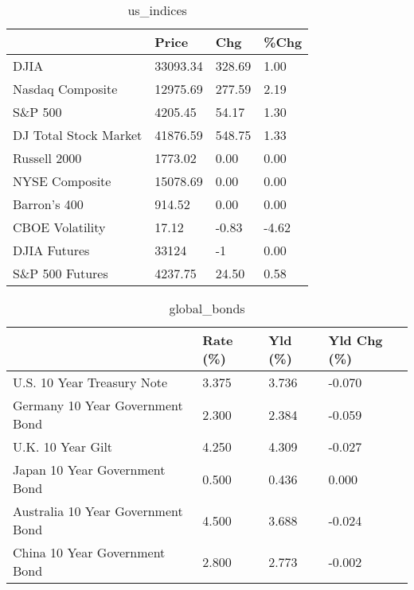 \documentclass{article}%
\begin{document}
%


\begin{table}[htbp]%
\caption{us\_indices}%
\centering%
\begin{adjustbox}{width=1\textwidth}%
\begin{tabular}{llll}
\toprule
                      &    Price &    Chg &  \%Chg \\
\midrule
                 DJIA & 33093.34 & 328.69 &  1.00 \\
     Nasdaq Composite & 12975.69 & 277.59 &  2.19 \\
              S\&P 500 &  4205.45 &  54.17 &  1.30 \\
DJ Total Stock Market & 41876.59 & 548.75 &  1.33 \\
         Russell 2000 &  1773.02 &   0.00 &  0.00 \\
       NYSE Composite & 15078.69 &   0.00 &  0.00 \\
         Barron's 400 &   914.52 &   0.00 &  0.00 \\
      CBOE Volatility &    17.12 &  -0.83 & -4.62 \\
         DJIA Futures &    33124 &     -1 &  0.00 \\
      S\&P 500 Futures &  4237.75 &  24.50 &  0.58 \\
\bottomrule
\end{tabular}
%
\end{adjustbox}%
\end{table}

%


\begin{table}[htbp]%
\caption{global\_bonds}%
\centering%
\begin{adjustbox}{width=1\textwidth}%
\begin{tabular}{llll}
\toprule
                                  & Rate (\%) & Yld (\%) & Yld Chg (\%) \\
\midrule
       U.S. 10 Year Treasury Note &    3.375 &   3.736 &      -0.070 \\
  Germany 10 Year Government Bond &    2.300 &   2.384 &      -0.059 \\
                U.K. 10 Year Gilt &    4.250 &   4.309 &      -0.027 \\
    Japan 10 Year Government Bond &    0.500 &   0.436 &       0.000 \\
Australia 10 Year Government Bond &    4.500 &   3.688 &      -0.024 \\
    China 10 Year Government Bond &    2.800 &   2.773 &      -0.002 \\
\bottomrule
\end{tabular}
%
\end{adjustbox}%
\end{table}
\end{document}
